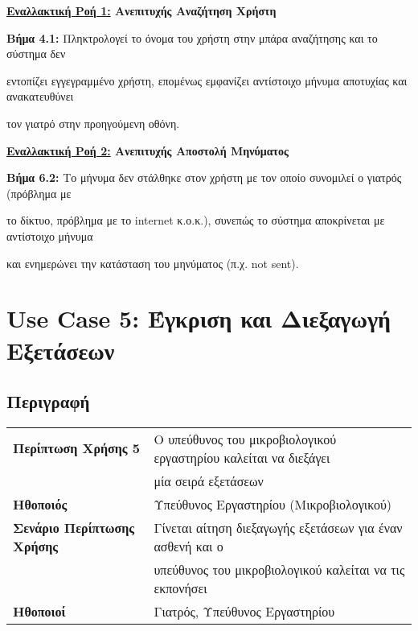 \documentclass{article}
\newcommand\T{\rule{0pt}{2.6ex}}       %
\newcommand\B{\rule[-1.2ex]{0pt}{0pt}}
\begin{document}
\textbf{\underline{Εναλλακτική Ροή 1:} Ανεπιτυχής Αναζήτηση Χρήστη} \vspace{0.2cm}
\par \textbf{Βήμα 4.1:} Πληκτρολογεί το όνομα του χρήστη στην μπάρα αναζήτησης και το σύστημα δεν \par εντοπίζει εγγεγραμμένο χρήστη, επομένως εμφανίζει αντίστοιχο μήνυμα αποτυχίας και ανακατευθύνει \par τον γιατρό στην προηγούμενη οθόνη. \vspace{0.2cm}

 \newpage

\textbf{\underline{Εναλλακτική Ροή 2:} Ανεπιτυχής Αποστολή Μηνύματος} \vspace{0.2cm}
\par \textbf{Βήμα 6.2:} Το μήνυμα δεν στάλθηκε στον χρήστη με τον οποίο συνομιλεί ο γιατρός (πρόβλημα με \par το δίκτυο, πρόβλημα με το internet κ.ο.κ.), συνεπώς το σύστημα αποκρίνεται με αντίστοιχο μήνυμα \par και ενημερώνει την κατάσταση του μηνύματος (π.χ. not sent).

\section{Use Case 5: Έγκριση και Διεξαγωγή Εξετάσεων}

\subsection{Περιγραφή}

\begin{center}
     \begin{tabular}{|l|l|}
     \hline
      \textbf{Περίπτωση Χρήσης 5} & Ο υπεύθυνος του μικροβιολογικού εργαστηρίου καλείται να διεξάγει\T\\& μία σειρά εξετάσεων\B \\ 
      \hline
      \textbf{Ηθοποιός} & Υπεύθυνος Εργαστηρίου (Μικροβιολογικού) \T\B \\
      \hline
      \textbf{Σενάριο Περίπτωσης Χρήσης} & Γίνεται αίτηση διεξαγωγής εξετάσεων για έναν ασθενή και ο \T \\& υπεύθυνος του μικροβιολογικού καλείται να τις εκπονήσει \B \\
      \hline
      \textbf{Ηθοποιοί} & Γιατρός, Υπεύθυνος Εργαστηρίου \T\B \\
      \hline
     \end{tabular}
 \end{center}
 
\end{document}
